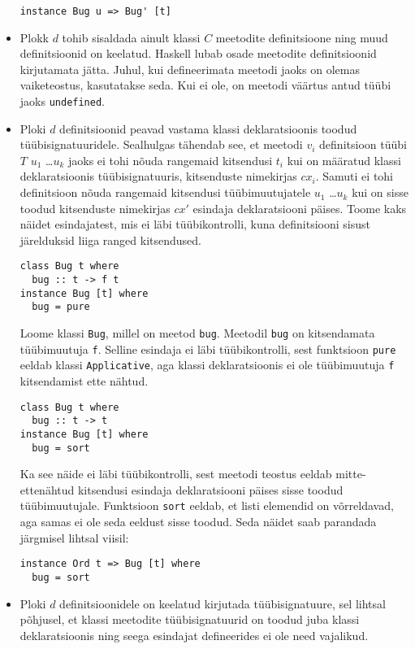 \documentclass[12pt]{article}
\begin{document}
\begin{itemize}
            \begin{verbatim}instance Bug u => Bug' [t]\end{verbatim}
          \item
            Plokk $d$ tohib sisaldada ainult klassi $C$ meetodite definitsioone ning muud definitsioonid on keelatud. Haskell lubab osade meetodite definitsioonid kirjutamata jätta. Juhul, kui defineerimata meetodi jaoks on olemas vaiketeostus, kasutatakse seda. Kui ei ole, on meetodi väärtus antud tüübi jaoks \verb!undefined!. 
          \item
            Ploki $d$ definitsioonid peavad vastama klassi deklaratsioonis toodud tüübisignatuuridele. Sealhulgas tähendab see, et meetodi $v_i$ definitsioon tüübi $T$ $u_1$ \ldots $u_k$ jaoks ei tohi nõuda rangemaid kitsendusi $t_i$ kui on määratud klassi deklaratsioonis tüübisignatuuris, kitsenduste nimekirjas $cx_i$. Samuti ei tohi definitsioon nõuda rangemaid kitsendusi tüübimuutujatele $u_1$ \ldots $u_k$ kui on sisse toodud kitsenduste nimekirjas $cx'$ esindaja deklaratsiooni päises. Toome kaks näidet esindajatest, mis ei läbi tüübikontrolli, kuna definitsiooni sisust järelduksid liiga ranged kitsendused.

            \begin{verbatim}class Bug t where
  bug :: t -> f t
instance Bug [t] where
  bug = pure\end{verbatim}

            Loome klassi \verb!Bug!, millel on meetod \verb!bug!. Meetodil \verb!bug! on kitsendamata tüübimuutuja \verb!f!. Selline esindaja ei läbi tüübikontrolli, sest funktsioon \verb!pure! eeldab klassi \verb!Applicative!, aga klassi deklaratsioonis ei ole tüübimuutuja \verb!f! kitsendamist ette nähtud.

            \begin{verbatim}class Bug t where
  bug :: t -> t
instance Bug [t] where
  bug = sort\end{verbatim}

            Ka see näide ei läbi tüübikontrolli, sest meetodi teostus eeldab mitte-ettenähtud kitsendusi esindaja deklaratsiooni päises sisse toodud tüübimuutujale. Funktsioon \verb!sort! eeldab, et listi elemendid on võrreldavad, aga samas ei ole seda eeldust sisse toodud. Seda näidet saab parandada järgmisel lihtsal viisil:

            \begin{verbatim}instance Ord t => Bug [t] where
  bug = sort\end{verbatim}
          \item
            Ploki $d$ definitsioonidele on keelatud kirjutada tüübisignatuure, sel lihtsal põhjusel, et klassi meetodite tüübisignatuurid on toodud juba klassi deklaratsioonis ning seega esindajat defineerides ei ole need vajalikud.
        \end{itemize}
\end{document}
